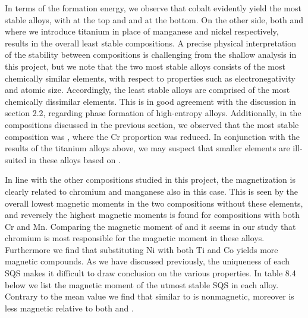 In terms of the formation energy, we observe that cobalt evidently yield the most stable alloys, with  at the top and and  at the bottom. On the other side, both  and  where we introduce titanium in place of manganese and nickel respectively, results in the overall least stable compositions. A precise physical interpretation of the stability between compositions is challenging from the shallow analysis in this project, but we note that the two most stable alloys consists of the most chemically similar elements, with respect to properties such as electronegativity and atomic size. Accordingly, the least stable alloys are comprised of the most chemically dissimilar elements. This is in good agreement with the discussion in section 2.2, regarding phase formation of high-entropy alloys. Additionally, in the compositions discussed in the previous section, we observed that the most stable composition was , where the Cr proportion was reduced. In conjunction with the results of the titanium alloys above, we may suspect that smaller elements are ill-suited in these alloys based on .   

In line with the other compositions studied in this project, the magnetization is clearly related to chromium and manganese also in this case. This is seen by the overall lowest magnetic moments in the two compositions without these elements, and reversely the highest magnetic moments is found for compositions with both Cr and Mn. Comparing the magnetic moment of  and  it seems in our study that chromium is most responsible for the magnetic moment in these alloys. Furthermore we find that substituting Ni with both Ti and Co yields more magnetic compounds. As we have discussed previously, the uniqueness of each SQS makes it difficult to draw conclusion on the various properties. In table 8.4 below we list the magnetic moment of the utmost stable SQS in each alloy. Contrary to the mean value we find that  similar to  is nonmagnetic, moreover  is less magnetic relative to both  and . 

